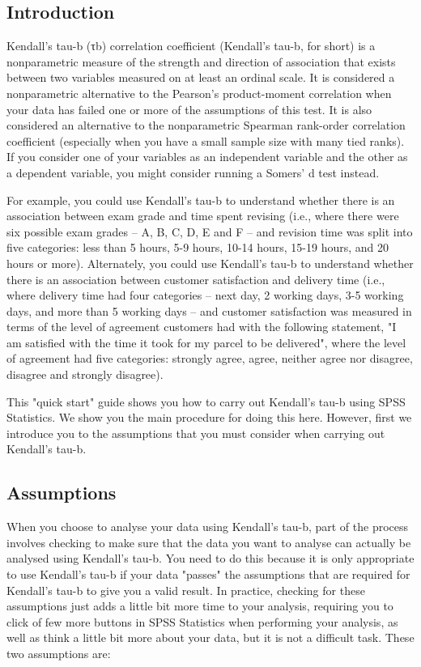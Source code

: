 \documentclass[]{article}
\begin{document}
\subsection{Introduction}
Kendall's tau-b (τb) correlation coefficient (Kendall's tau-b, for short) is a nonparametric measure of the strength and direction of association that exists between two variables measured on at least an ordinal scale. It is considered a nonparametric alternative to the Pearson’s product-moment correlation when your data has failed one or more of the assumptions of this test. It is also considered an alternative to the nonparametric Spearman rank-order correlation coefficient (especially when you have a small sample size with many tied ranks). If you consider one of your variables as an independent variable and the other as a dependent variable, you might consider running a Somers' d test instead.

For example, you could use Kendall's tau-b to understand whether there is an association between exam grade and time spent revising (i.e., where there were six possible exam grades – A, B, C, D, E and F – and revision time was split into five categories: less than 5 hours, 5-9 hours, 10-14 hours, 15-19 hours, and 20 hours or more). Alternately, you could use Kendall's tau-b to understand whether there is an association between customer satisfaction and delivery time (i.e., where delivery time had four categories – next day, 2 working days, 3-5 working days, and more than 5 working days – and customer satisfaction was measured in terms of the level of agreement customers had with the following statement, "I am satisfied with the time it took for my parcel to be delivered", where the level of agreement had five categories: strongly agree, agree, neither agree nor disagree, disagree and strongly disagree).

This "quick start" guide shows you how to carry out Kendall's tau-b using SPSS Statistics. We show you the main procedure for doing this here. However, first we introduce you to the assumptions that you must consider when carrying out Kendall's tau-b.

\subsection{Assumptions}
When you choose to analyse your data using Kendall's tau-b, part of the process involves checking to make sure that the data you want to analyse can actually be analysed using Kendall's tau-b. You need to do this because it is only appropriate to use Kendall's tau-b if your data "passes" the assumptions that are required for Kendall's tau-b to give you a valid result. In practice, checking for these assumptions just adds a little bit more time to your analysis, requiring you to click of few more buttons in SPSS Statistics when performing your analysis, as well as think a little bit more about your data, but it is not a difficult task. These two assumptions are:
\end{document}
